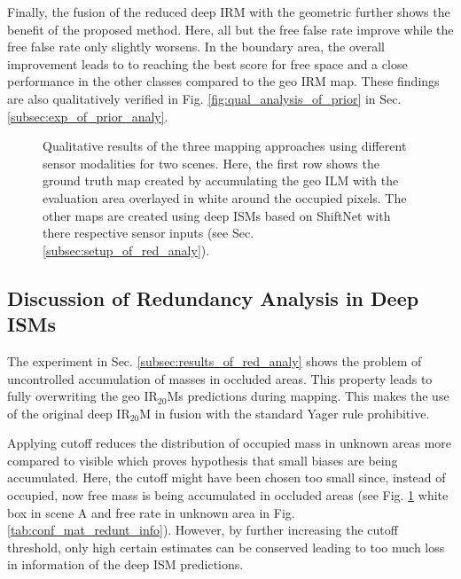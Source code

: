 Finally, the fusion of the reduced deep IRM with the geometric further shows the benefit of the proposed method. Here, all but the free false rate improve while the free false rate only slightly worsens. In the boundary area, the overall improvement leads to to reaching the best score for free space and a close performance in the other classes compared to the geo IRM map. These findings are also qualitatively verified in Fig. \ref{fig:qual_analysis_of_prior} in Sec. \ref{subsec:exp_of_prior_analy}.
\begin{figure}[H]
	\begin{center}
		\caption{\label{fig:qual_analysis_of_redundant_info}Qualitative results of the three mapping approaches using different sensor modalities for two scenes. Here, the first row shows the ground truth map created by accumulating the geo ILM with the evaluation area overlayed in white around the occupied pixels. The other maps are created using deep ISMs based on ShiftNet with there respective sensor inputs (see Sec. \ref{subsec:setup_of_red_analy}).}
	\end{center}
\end{figure}
%
\subsection{Discussion of Redundancy Analysis in Deep ISMs}
\label{subsec:discussion_of_red_analy}
The experiment in Sec. \ref{subsec:results_of_red_analy} shows the problem of uncontrolled accumulation of masses in occluded areas. This property leads to fully overwriting the geo IR$_{20}$Ms predictions during mapping. This makes the use of the original deep IR$_{20}$M in fusion with the standard Yager rule prohibitive. 

Applying cutoff reduces the distribution of occupied mass in unknown areas more compared to visible which proves hypothesis  that small biases are being accumulated. Here, the cutoff might have been chosen too small since, instead of occupied, now free mass is being accumulated in occluded areas (see Fig. \ref{fig:qual_analysis_of_redundant_info} white box in scene A and free rate in unknown area in Fig. \ref{tab:conf_mat_redunt_info}). However, by further increasing the cutoff threshold, only high certain estimates can be conserved leading to too much loss in information of the deep ISM predictions. 

